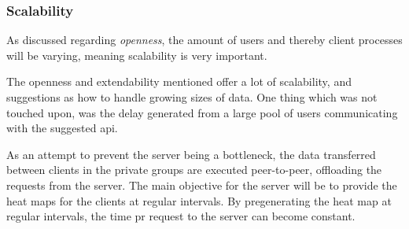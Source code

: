 
\subsubsection{Scalability}
As discussed regarding \textit{openness}, the amount of users and thereby client processes will be varying, meaning scalability is very important. 

The openness and extendability mentioned offer a lot of scalability, and suggestions as how to handle growing sizes of data. One thing which was not touched upon, was the delay generated from a large pool of users communicating with the suggested api. 

As an attempt to prevent the server being a bottleneck, the data transferred between clients in the private groups are executed peer-to-peer, offloading the requests from the server. The main objective for the server will be to provide the heat maps for the clients at regular intervals. By pregenerating the heat map at regular intervals, the time pr request to the server can become constant.

